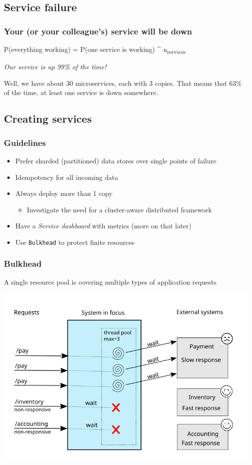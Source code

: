 \documentclass[8pt]{article}
\begin{document}
\subsection{Service failure}
\label{sec:org201e871}
\subsubsection{Your (or your colleague's) service will be down}
\label{sec:org5ae75ae}
P(everything working) = P(one service is working) \^{} n\textsubscript{services}

\emph{Our service is up 99\% of the time!}

Well, we have about 30 microservices, each with 3 copies.
That means that 63\% of the time, at least one service is down somewhere.
\subsection{Creating services}
\label{sec:orgacf3789}
\subsubsection{Guidelines}
\label{sec:orgc1f1276}
\begin{itemize}
\item Prefer sharded (partitioned) data stores over single points of failure
\item Idempotency for all incoming data
\item Always deploy more than 1 copy
\begin{itemize}
\item Investigate the need for a cluster-aware distributed framework
\end{itemize}
\item Have a \emph{Service dashboard} with metrics (more on that later)
\item Use \texttt{Bulkhead} to protect finite resources
\end{itemize}
\subsubsection{Bulkhead}
\label{sec:org811955b}
A single resource pool is covering multiple types of application requests

\begin{center}
\includegraphics[width=.9\linewidth]{graphics/svg/without_bulkhead.png}
\end{center}
\end{document}
